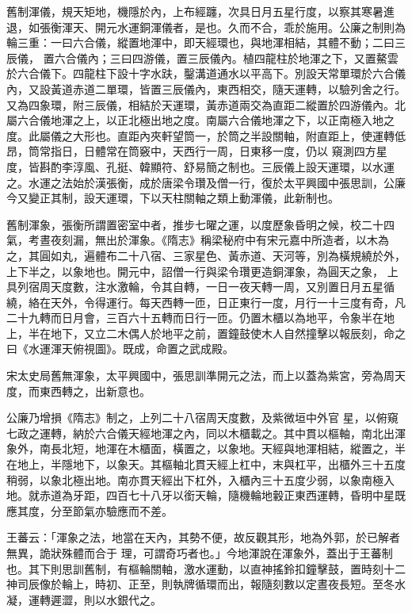 \begin{pinyinscope}
 舊制渾儀，規天矩地，機隱於內，上布經躔，次具日月五星行度，以察其寒暑進退，如張衡渾天、開元水運銅渾儀者，是也。久而不合，乖於施用。公廉之制則為輪三重：一曰六合儀，縱置地渾中，即天經環也，與地渾相結，其體不動；二曰三辰儀，
 置六合儀內；三曰四游儀，置三辰儀內。植四龍柱於地渾之下，又置鰲雲於六合儀下。四龍柱下設十字水趺，鑿溝道通水以平高下。別設天常單環於六合儀內，又設黃道赤道二單環，皆置三辰儀內，東西相交，隨天運轉，以驗列舍之行。又為四象環，附三辰儀，相結於天運環，黃赤道兩交為直距二縱置於四游儀內。北屬六合儀地渾之上，以正北極出地之度。南屬六合儀地渾之下，以正南極入地之度。此屬儀之大形也。直距內夾軒望筒一，於筒之半設關軸，附直距上，使運轉低昂，筒常指日，日體常在筒竅中，天西行一周，日東移一度，仍以
 窺測四方星度，皆斟酌李淳風、孔挺、韓顯符、舒易簡之制也。三辰儀上設天運環，以水運之。水運之法始於漢張衡，成於唐梁令瓚及僧一行，復於太平興國中張思訓，公廉今又變正其制，設天運環，下以天柱關軸之類上動渾儀，此新制也。



 舊制渾象，張衡所謂置密室中者，推步七曜之運，以度歷象昏明之候，校二十四氣，考晝夜刻漏，無出於渾象。《隋志》稱梁秘府中有宋元嘉中所造者，以木為之，其圓如丸，遍體布二十八宿、三家星色、黃赤道、天河等，別為橫規繞於外，上下半之，以象地也。開元中，詔僧一行與梁令瓚更造銅渾象，為圓天之象，
 上具列宿周天度數，注水激輪，令其自轉，一日一夜天轉一周，又別置日月五星循繞，絡在天外，令得運行。每天西轉一匝，日正東行一度，月行一十三度有奇，凡二十九轉而日月會，三百六十五轉而日行一匝。仍置木櫃以為地平，令象半在地上，半在地下，又立二木偶人於地平之前，置鐘鼓使木人自然撞擊以報辰刻，命之曰《水運渾天俯視圖》。既成，命置之武成殿。



 宋太史局舊無渾象，太平興國中，張思訓準開元之法，而上以蓋為紫宮，旁為周天度，而東西轉之，出新意也。



 公廉乃增損《隋志》制之，上列二十八宿周天度數，及紫微垣中外官
 星，以俯窺七政之運轉，納於六合儀天經地渾之內，同以木櫃載之。其中貫以樞軸，南北出渾象外，南長北短，地渾在木櫃面，橫置之，以象地。天經與地渾相結，縱置之，半在地上，半隱地下，以象天。其樞軸北貫天經上杠中，末與杠平，出櫃外三十五度稍弱，以象北極出地。南亦貫天經出下杠外，入櫃內三十五度少弱，以象南極入地。就赤道為牙距，四百七十八牙以銜天輪，隨機輪地轂正東西運轉，昏明中星既應其度，分至節氣亦驗應而不差。



 王蕃云：「渾象之法，地當在天內，其勢不便，故反觀其形，地為外郭，於已解者無異，詭狀殊體而合于
 理，可謂奇巧者也。」今地渾說在渾象外，蓋出于王蕃制也。其下則思訓舊制，有樞輪關軸，激水運動，以直神搖鈴扣鐘擊鼓，置時刻十二神司辰像於輪上，時初、正至，則執牌循環而出，報隨刻數以定晝夜長短。至冬水凝，運轉遲澀，則以水銀代之。




\end{pinyinscope}
